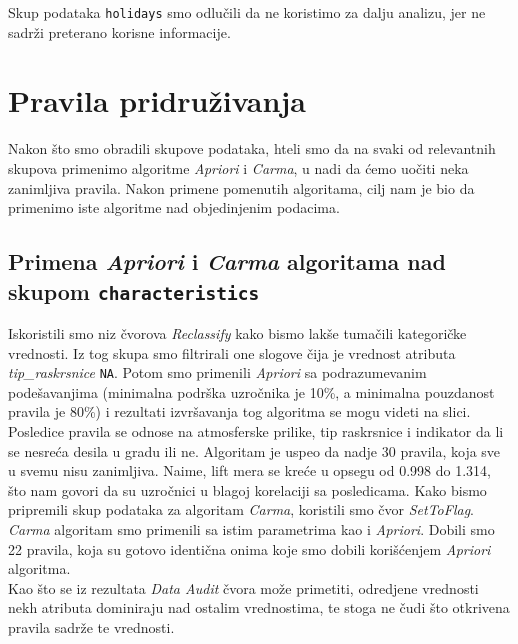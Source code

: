 \documentclass[a4paper,10pt]{article}
\begin{document}
Skup podataka \texttt{holidays} smo odlučili da ne koristimo za dalju analizu, jer ne sadrži preterano korisne informacije.

\section{Pravila pridruživanja}
Nakon što smo obradili skupove podataka, hteli smo da na svaki od relevantnih skupova primenimo algoritme \textit{Apriori} i \textit{Carma},
u nadi da ćemo uočiti neka zanimljiva pravila. Nakon primene pomenutih algoritama, cilj nam je bio da primenimo iste algoritme nad objedinjenim podacima.

\subsection{Primena \textit{Apriori} i \textit{Carma} algoritama nad skupom \texttt{characteristics}}
Iskoristili smo niz čvorova \textit{Reclassify} kako bismo lakše tumačili kategoričke vrednosti. Iz tog skupa smo filtrirali one slogove čija je 
vrednost atributa \textit{tip\_raskrsnice} \texttt{NA}. Potom smo primenili \textit{Apriori} sa podrazumevanim podešavanjima 
(minimalna podrška uzročnika je 10\%, a minimalna pouzdanost pravila je 80\%) i rezultati izvršavanja
tog algoritma se mogu videti na slici. Posledice pravila se odnose na atmosferske prilike, tip raskrsnice i indikator da li se nesreća desila u gradu ili ne.
Algoritam je uspeo da nadje 30 pravila, koja sve u svemu nisu zanimljiva. Naime, lift mera se kreće u opsegu od 0.998 do 1.314, što nam govori da su
uzročnici u blagoj korelaciji sa posledicama. Kako bismo pripremili skup podataka za algoritam \textit{Carma}, koristili smo čvor \textit{SetToFlag}. 
\textit{Carma} algoritam smo primenili sa istim parametrima kao i \textit{Apriori}. Dobili smo 22 pravila, koja su gotovo identična onima koje smo
dobili korišćenjem \textit{Apriori} algoritma. \\
 
Kao što se iz rezultata \textit{Data Audit} čvora može primetiti, odredjene vrednosti nekh atributa dominiraju nad ostalim vrednostima, te stoga ne
čudi što otkrivena pravila sadrže te vrednosti. 
\end{document}
